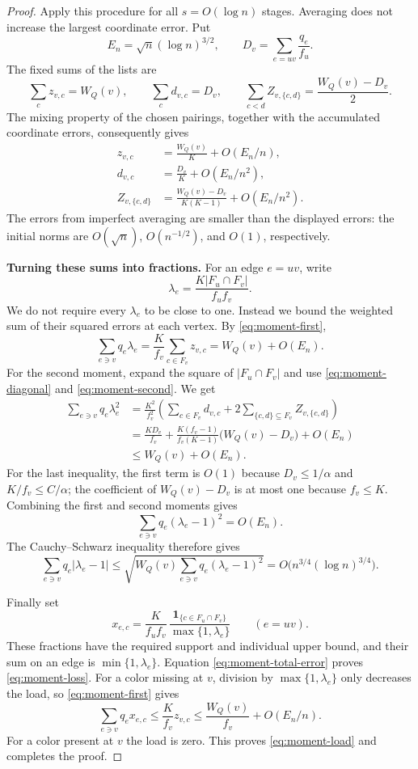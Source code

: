 \documentclass[11pt]{article}
\theoremstyle{definition}\newtheorem{algorithm}{Algorithm}[section]
\numberwithin{equation}{section}
\theoremstyle{remark}\newtheorem*{remark}{Remark}
\newcommand{\one}{\mathbf 1}
\begin{document}
\begin{proof}
Apply this procedure for all $s=O(\log n)$ stages. Averaging does not
increase the largest coordinate error. Put
\[
 E_n=\sqrt n(\log n)^{3/2},\qquad
 D_v=\sum_{e=uv}\frac{q_e}{f_u}.
\]
The fixed sums of the lists are
\[
 \sum_cz_{v,c}=W_Q(v),\qquad
 \sum_cd_{v,c}=D_v,\qquad
 \sum_{c<d}Z_{v,\{c,d\}}=\frac{W_Q(v)-D_v}{2}.
\]
The mixing property of the chosen pairings, together with the accumulated
coordinate errors, consequently gives
\begin{align}
 z_{v,c}&=\frac{W_Q(v)}K+O(E_n/n),\label{eq:moment-first}\\
 d_{v,c}&=\frac{D_v}K+O(E_n/n^2),\label{eq:moment-diagonal}\\
 Z_{v,\{c,d\}}
 &=\frac{W_Q(v)-D_v}{K(K-1)}+O(E_n/n^2).
 \label{eq:moment-second}
\end{align}
The errors from imperfect averaging are smaller than the displayed errors:
the initial norms are $O(\sqrt n)$, $O(n^{-1/2})$, and $O(1)$,
respectively.

\medskip\noindent\textbf{Turning these sums into fractions.}
For an edge $e=uv$, write
\[
 \lambda_e=\frac{K|F_u\cap F_v|}{f_uf_v}.
\]
We do not require every $\lambda_e$ to be close to one. Instead we bound
the weighted sum of their squared errors at each vertex.
By \eqref{eq:moment-first},
\[
 \sum_{e\ni v}q_e\lambda_e
 =\frac K{f_v}\sum_{c\in F_v}z_{v,c}
 =W_Q(v)+O(E_n).
\]
For the second moment, expand the square of $|F_u\cap F_v|$ and use
\eqref{eq:moment-diagonal} and \eqref{eq:moment-second}. We get
\begin{align*}
 \sum_{e\ni v}q_e\lambda_e^2
 &=\frac{K^2}{f_v^2}\left(
       \sum_{c\in F_v}d_{v,c}
       +2\sum_{\{c,d\}\subseteq F_v}Z_{v,\{c,d\}}\right)\\
 &=\frac{K D_v}{f_v}
   +\frac{K(f_v-1)}{f_v(K-1)}\bigl(W_Q(v)-D_v\bigr)+O(E_n)\\
 &\le W_Q(v)+O(E_n).
\end{align*}
For the last inequality, the first term is $O(1)$ because
$D_v\le1/\alpha$ and $K/f_v\le C/\alpha$; the coefficient of
$W_Q(v)-D_v$ is at most one because $f_v\le K$.
Combining the first and
second moments gives
\[
 \sum_{e\ni v}q_e(\lambda_e-1)^2=O(E_n).
\]
The Cauchy--Schwarz inequality therefore gives
\begin{equation}
 \sum_{e\ni v}q_e|\lambda_e-1|
 \le\sqrt{W_Q(v)\sum_{e\ni v}q_e(\lambda_e-1)^2}
 =O\bigl(n^{3/4}(\log n)^{3/4}\bigr).
 \label{eq:moment-total-error}
\end{equation}

Finally set
\[
 x_{e,c}=\frac{K}{f_uf_v}\,
       \frac{\one_{\{c\in F_u\cap F_v\}}}{\max\{1,\lambda_e\}}
       \qquad(e=uv).
\]
These fractions have the required support and individual upper bound,
and their sum on an edge is $\min\{1,\lambda_e\}$. Equation
\eqref{eq:moment-total-error} proves \eqref{eq:moment-loss}. For a color
missing at $v$, division by $\max\{1,\lambda_e\}$ only decreases the load,
so \eqref{eq:moment-first} gives
\[
 \sum_{e\ni v}q_ex_{e,c}
 \le\frac K{f_v}z_{v,c}
 \le\frac{W_Q(v)}{f_v}+O(E_n/n).
\]
For a color present at $v$ the load is zero. This proves
\eqref{eq:moment-load} and completes the proof.
\end{proof}
\end{document}
